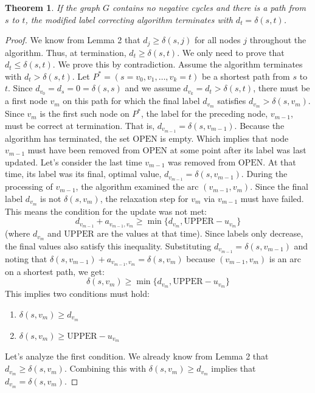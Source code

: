\documentclass[11pt, a4paper, oneside]{memoir}
\newtheorem{theorem}{Theorem}
\newcommand{\UPPER}{\text{UPPER}}
\newcommand{\OPEN}{\text{OPEN}}
\begin{document}
\begin{theorem}
If the graph $G$ contains no negative cycles and there is a path from $s$ to $t$,
the modified label correcting algorithm terminates with $d_t = \delta(s, t)$.
\end{theorem}
\begin{proof}
We know from Lemma 2 that $d_j \ge \delta(s, j)$ for all nodes $j$ throughout the algorithm.
Thus, at termination, $d_t \ge \delta(s, t)$. We only need to prove that $d_t \le \delta(s, t)$.
We prove this by contradiction. Assume the algorithm terminates with $d_t > \delta(s, t)$.
Let $P^* = (s=v_0, v_1, \dots, v_k=t)$ be a shortest path from $s$ to $t$.
Since $d_{v_0} = d_s = 0 = \delta(s, s)$ and we assume $d_{v_k} = d_t > \delta(s, t)$,
there must be a first node $v_m$ on this path for which the final label $d_{v_m}$ satisfies $d_{v_m} > \delta(s, v_m)$.
Since $v_m$ is the first such node on $P^*$, the label for the preceding node, $v_{m-1}$,
must be correct at termination. That is, $d_{v_{m-1}} = \delta(s, v_{m-1})$.
Because the algorithm has terminated, the set $\OPEN$ is empty.
Which implies that node $v_{m-1}$ must have been removed from $\OPEN$ at some point after its label was last updated.
Let's consider the last time $v_{m-1}$ was removed from $\OPEN$.
At that time, its label was its final, optimal value, $d_{v_{m-1}} = \delta(s, v_{m-1})$.
During the processing of $v_{m-1}$, the algorithm examined the arc $(v_{m-1}, v_m)$.
Since the final label $d_{v_m}$ is not $\delta(s, v_m)$, the relaxation step for $v_m$ via $v_{m-1}$ must have failed.
This means the condition for the update was not met:
\[ d_{v_{m-1}} + a_{v_{m-1}, v_m} \ge \min\{d_{v_m}, \UPPER - u_{v_m}\} \]
(where $d_{v_m}$ and $\UPPER$ are the values at that time).
Since labels only decrease, the final values also satisfy this inequality.
Substituting $d_{v_{m-1}} = \delta(s, v_{m-1})$ and noting that $\delta(s, v_{m-1}) + a_{v_{m-1}, v_m} = \delta(s, v_m)$
because $(v_{m-1}, v_m)$ is an arc on a shortest path, we get:
\[ \delta(s, v_m) \ge \min\{d_{v_m}, \UPPER - u_{v_m}\} \]
This implies two conditions must hold:
\begin{enumerate}
    \item $\delta(s, v_m) \ge d_{v_m}$
    \item $\delta(s, v_m) \ge \UPPER - u_{v_m}$
\end{enumerate}
Let's analyze the first condition. We already know from Lemma 2 that $d_{v_m} \ge \delta(s, v_m)$.
Combining this with $\delta(s, v_m) \ge d_{v_m}$ implies that $d_{v_m} = \delta(s, v_m)$.

\end{proof}
\end{document}
